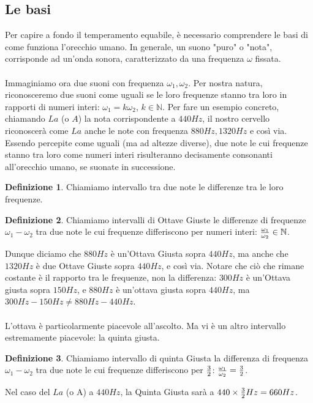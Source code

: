 \documentclass[12pt,a4paper]{report}
\theoremstyle{definition}
\newtheorem{Def}{Definizione}[chapter]
\theoremstyle{Theorem}
\theoremstyle{definition}
\theoremstyle{definition}
\theoremstyle{definition}
\begin{document}
	\subsection{Le basi}
	Per capire a fondo il temperamento equabile, è necessario comprendere le basi di come funziona l'orecchio umano. In generale, un suono "puro" o "nota", corrisponde ad un'onda sonora, caratterizzato da una frequenza $\omega$ fissata.\\
	\\
	Immaginiamo ora due suoni con frequenza $\omega_1,\omega_2$. Per nostra natura, riconosceremo due suoni come uguali se le loro frequenze stanno tra loro in rapporti di numeri interi: $\omega_1=k\omega_2$, $k\in \mathbb{N}$. Per fare un esempio concreto, chiamando $La$ (o $A$) la nota corrispondente a $440 Hz$, il nostro cervello riconoscerà come $La$ anche le note con frequenza $880 Hz,1320 Hz$ e così via. Essendo percepite come uguali (ma ad altezze diverse), due note le cui frequenze stanno tra loro come numeri interi risulteranno decisamente consonanti all'orecchio umano, se suonate in successione.
	\begin{Def}
		Chiamiamo intervallo tra due note le differenze tra le loro frequenze.
	\end{Def}
	\begin{Def}
		Chiamiamo intervalli di Ottave Giuste le differenze di frequenze $\omega_1-\omega_2$ tra due note le cui frequenze differiscono per numeri interi: ${\omega_1\over\omega_2}\in \mathbb{N}$.
	\end{Def}
	Dunque diciamo che $880Hz$ è un'Ottava Giusta sopra $440 Hz$, ma anche che $1320 Hz$ è due Ottave Giuste sopra $440 Hz$, e così via. Notare che ciò che rimane costante è il rapporto tra le frequenze, non la differenza: $300Hz$ è un'Ottava giusta sopra $150 Hz$, e $880Hz$ è un'ottava giusta sopra $440 Hz$, ma $300Hz-150Hz\neq 880Hz-440Hz$.\\
	\\
	L'ottava è particolarmente piacevole all'ascolto. Ma vi è un altro intervallo estremamente piacevole: la quinta giusta.
	\begin{Def}
		Chiamiamo intervallo di quinta Giusta la differenza di frequenza $\omega_1-\omega_2$ tra due note le cui frequenze differiscono per $3\over 2$: ${\omega_1\over\omega_2}={3\over 2}$.
	\end{Def}
	Nel caso del $La$ (o A) a $440 Hz$, la Quinta Giusta sarà a $440\times {3\over 2}Hz=660 Hz$.\\
	\\
\end{document}
